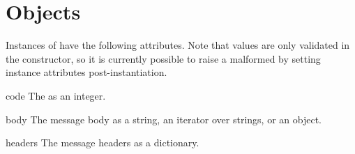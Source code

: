 \section{ Objects \label{response}}

Instances of  have the following attributes. Note that
values are only validated in the constructor, so it is currently possible to
raise a malformed  by setting instance attributes
post-instantiation.

\begin{datadesc}{code}
The  as an integer.
\end{datadesc}

\begin{datadesc}{body}
The message body as a string, an iterator over strings, or an
 object.
\end{datadesc}

\begin{datadesc}{headers}
The message headers as a dictionary.
\end{datadesc}
